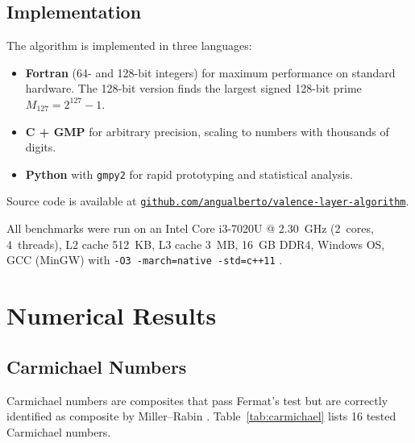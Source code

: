 \documentclass{sbc2023-pdf}%
\theoremstyle{plain}
\begin{document}
\subsection{Implementation}
\label{sec:impl}

The algorithm is implemented in three languages:
\begin{itemize}
  \item {\bf Fortran} (64- and 128-bit integers) for maximum performance on standard hardware. The 128-bit version finds the largest signed 128-bit prime \(M_{127}=2^{127}-1\).
  \item {\bf C + GMP} \citep{gmp2020} for arbitrary precision, scaling to numbers with thousands of digits.
  \item {\bf Python} with {\tt gmpy2} for rapid prototyping and statistical analysis.
\end{itemize}

Source code is available at \href{https://github.com/angualberto/The-Valence-Layer-Algorithm-A-Structured-Approach-to-Consecutive-Primes}{\texttt{github.com/angualberto/valence-layer-algorithm}}.

All benchmarks were run on an Intel Core i3-7020U @ 2.30~GHz (2~cores, 4~threads), L2 cache 512~KB, L3 cache 3~MB, 16~GB DDR4, Windows OS, GCC (MinGW) with \texttt{-O3 -march=native -std=c++11} \citep{intel2024}.

\section{Numerical Results}
\label{sec:num}

\subsection{Carmichael Numbers}
\label{sec:carmichael}

Carmichael numbers are composites that pass Fermat's test but are correctly identified as composite by Miller--Rabin \citep{rabin1980}. Table~\ref{tab:carmichael} lists 16 tested Carmichael numbers.
\end{document}
